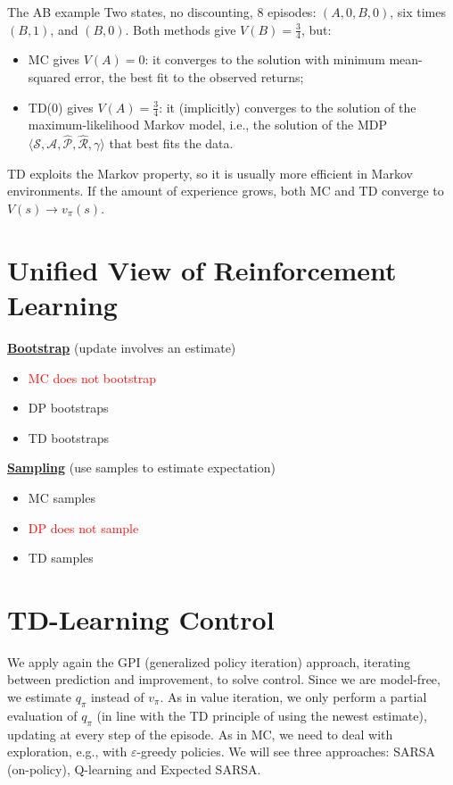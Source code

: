\begin{esempio}{The AB example}
Two states, no discounting, 8 episodes: $(A,0,B,0)$, six times $(B,1)$, and $(B,0)$. Both methods give $V(B)=\frac{3}{4}$, but:
\begin{itemize}
    \item MC gives $V(A)=0$: it converges to the solution with minimum mean-squared error, the best fit to the observed returns;
    \item TD(0) gives $V(A)=\frac{3}{4}$: it (implicitly) converges to the solution of the maximum-likelihood Markov model, i.e., the solution of the MDP $\langle\mathcal{S},\mathcal{A},\hat{\mathcal{P}},\hat{\mathcal{R}},\gamma\rangle$ that best fits the data.
\end{itemize}
\end{esempio}
TD exploits the Markov property, so it is usually more efficient in Markov environments. If the amount of experience grows, both MC and TD converge to $V(s)\to v_\pi(s)$.

\section{Unified View of Reinforcement Learning}

\noindent
\underline{\textbf{Bootstrap}} (update involves an estimate)

\begin{itemize}
    \item \textcolor{red}{MC does not bootstrap}
    \item \textcolor{green!70!black}{DP bootstraps}
    \item \textcolor{green!70!black}{TD bootstraps}
\end{itemize}

\medskip

\noindent
\underline{\textbf{Sampling}} (use samples to estimate expectation)

\begin{itemize}
    \item \textcolor{green!70!black}{MC samples}
    \item \textcolor{red}{DP does not sample}
    \item \textcolor{green!70!black}{TD samples}
\end{itemize}

\section{TD-Learning Control}
We apply again the GPI (generalized policy iteration) approach, iterating between prediction and improvement, to solve control. Since we are model-free, we estimate $q_\pi$ instead of $v_\pi$. As in value iteration, we only perform a partial evaluation of $q_\pi$ (in line with the TD principle of using the newest estimate), updating at every step of the episode. As in MC, we need to deal with exploration, e.g., with $\varepsilon$-greedy policies. We will see three approaches: SARSA (on-policy), Q-learning and Expected SARSA.
